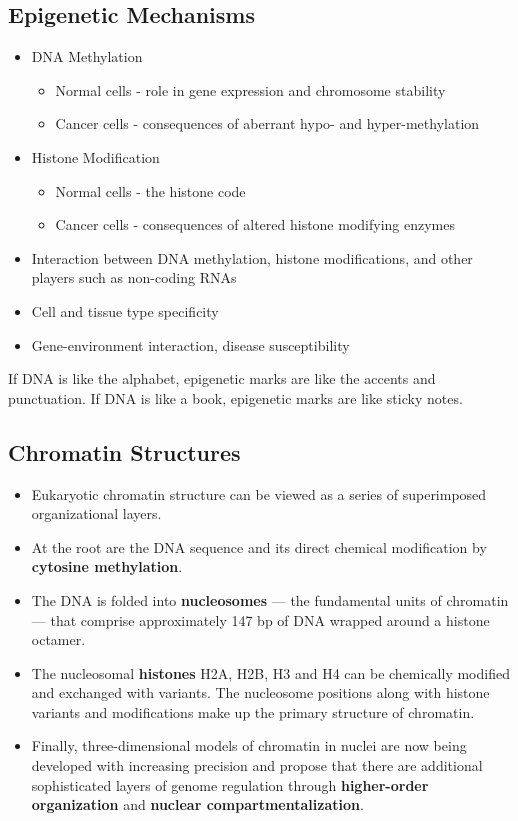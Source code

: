 \documentclass[10pt]{article}
\begin{document}
\subsection*{Epigenetic Mechanisms}
\begin{itemize}
	\item DNA Methylation
	\begin{itemize}
	    \item Normal cells - role in gene expression and chromosome stability
	    \item Cancer cells - consequences of aberrant hypo- and hyper-methylation
    \end{itemize}
	\item Histone Modification
	\begin{itemize}
	    \item Normal cells - the histone code
	    \item Cancer cells - consequences of altered histone modifying enzymes
    \end{itemize}
	\item Interaction between DNA methylation, histone modifications, and other players such as non-coding RNAs
	\item Cell and tissue type specificity
	\item Gene-environment interaction, disease susceptibility
\end{itemize}
If DNA is like the alphabet, epigenetic marks are like the accents and punctuation.  If DNA is like a book, epigenetic marks are like sticky notes.

\subsection*{Chromatin Structures}
\begin{itemize}
	\item Eukaryotic chromatin structure can be viewed as a series of superimposed organizational layers.     
    \item At the root are the DNA sequence and its direct chemical modification by \textbf{cytosine methylation}.     
    \item The DNA is folded into \textbf{nucleosomes} — the fundamental units of chromatin — that comprise approximately 147 bp of DNA wrapped around a histone octamer.     
    \item The nucleosomal \textbf{histones} H2A, H2B, H3 and H4 can be chemically modified and exchanged with variants. The nucleosome positions along with histone variants and modifications make up the primary structure of chromatin.     
    \item Finally, three-dimensional models of chromatin in nuclei are now being developed with increasing precision and propose that there are additional sophisticated layers of genome regulation through \textbf{higher-order organization} and \textbf{nuclear compartmentalization}.
\end{itemize}
\end{document}
